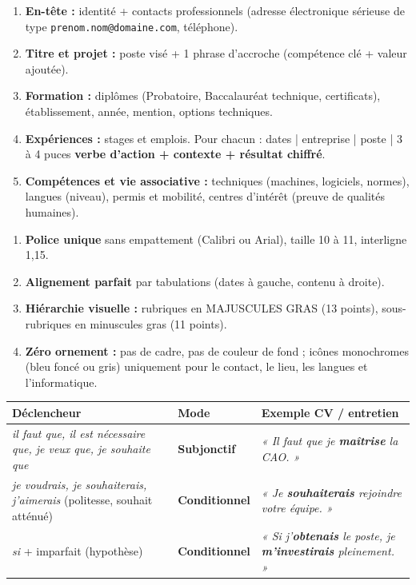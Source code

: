 \documentclass[11pt]{article}
\begin{document}
\begin{propriete}
\begin{enumerate}
  \item \textbf{En-tête :} identité + contacts professionnels (adresse électronique sérieuse de type \texttt{prenom.nom@domaine.com}, téléphone).
  \item \textbf{Titre et projet :} poste visé + 1 phrase d'accroche (compétence clé + valeur ajoutée).
  \item \textbf{Formation :} diplômes (Probatoire, Baccalauréat technique, certificats), établissement, année, mention, options techniques.
  \item \textbf{Expériences :} stages et emplois. Pour chacun : dates | entreprise | poste | 3 à 4 puces \textbf{verbe d'action + contexte + résultat chiffré}.
  \item \textbf{Compétences et vie associative :} techniques (machines, logiciels, normes), langues (niveau), permis et mobilité, centres d'intérêt (preuve de qualités humaines).
\end{enumerate}
\end{propriete}

\begin{propriete}
\begin{enumerate}
  \item \textbf{Police unique} sans empattement (Calibri ou Arial), taille 10 à 11, interligne 1,15.
  \item \textbf{Alignement parfait} par tabulations (dates à gauche, contenu à droite).
  \item \textbf{Hiérarchie visuelle :} rubriques en MAJUSCULES GRAS (13 points), sous-rubriques en minuscules gras (11 points).
  \item \textbf{Zéro ornement :} pas de cadre, pas de couleur de fond ; icônes monochromes (bleu foncé ou gris) uniquement pour le contact, le lieu, les langues et l'informatique.
\end{enumerate}
\end{propriete}

\begin{propriete}
\begin{center}
\begin{tabularx}{\linewidth}{|X|l|X|}\hline
\rowcolor{popblueL} \textbf{Déclencheur} & \textbf{Mode} & \textbf{Exemple CV / entretien} \\ \hline
\emph{il faut que, il est nécessaire que, je veux que, je souhaite que} & \textbf{Subjonctif} & \emph{« Il faut que je \textbf{maîtrise} la CAO. »} \\ \hline
\emph{je voudrais, je souhaiterais, j'aimerais} (politesse, souhait atténué) & \textbf{Conditionnel} & \emph{« Je \textbf{souhaiterais} rejoindre votre équipe. »} \\ \hline
\emph{si} + imparfait (hypothèse) & \textbf{Conditionnel} & \emph{« Si j'\textbf{obtenais} le poste, je \textbf{m'investirais} pleinement. »} \\ \hline
\end{tabularx}
\end{center}
\end{propriete}
\end{document}
